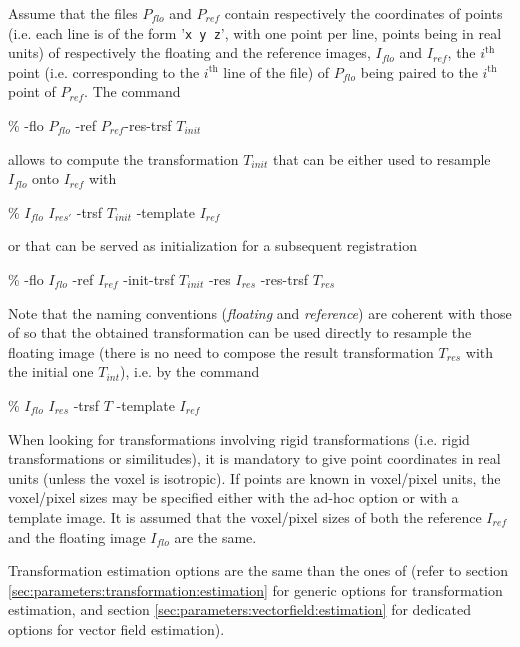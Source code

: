 Assume that the files $P_{flo}$ and  $P_{ref}$ contain respectively the coordinates of points (i.e. each line is of the form '\texttt{x y z}', with one point per line, points being in real units) of respectively the floating and the reference images, $I_{flo}$ and $I_{ref}$, the $i^{\mathrm{th}}$ point (i.e. corresponding to the $i^{\mathrm{th}}$ line of the file) of  $P_{flo}$ being paired to the  $i^{\mathrm{th}}$ point of  $P_{ref}$. The command
\begin{code}{0.8}
\% \pointmatching -flo $P_{flo}$ -ref $P_{ref}$-res-trsf $T_{init}$
\end{code}
allows to compute the transformation $T_{init}$ that can be 
either used to resample $I_{flo}$ onto $I_{ref}$ with
\begin{code}{0.8}
\% \applyTrsf $I_{flo}$ $I_{res'}$ -trsf $T_{init}$ -template $I_{ref}$ 
\end{code}
or that can be served as initialization for a subsequent registration
\begin{code}{0.8}
\% \blockmatching -flo $I_{flo}$ -ref $I_{ref}$ -init-trsf $T_{init}$ -res $I_{res}$ -res-trsf $T_{res}$ 
\end{code}

Note that the naming conventions (\textit{floating} and \textit{reference}) are coherent with those of \blockmatching so that the obtained transformation can be used directly to resample the floating image (there is no need to compose the result transformation $T_{res}$  with the initial one $T_{int}$), i.e. by the command
\begin{code}{0.8}
\% \applyTrsf $I_{flo}$ $I_{res}$ -trsf $T$ -template $I_{ref}$ 
\end{code}

\begin{attention} 
When looking for transformations involving rigid transformations (i.e. rigid transformations or similitudes), it is mandatory to give point coordinates in real units (unless the voxel is isotropic). If points are known in voxel/pixel units, the voxel/pixel sizes may be specified either with the ad-hoc option or with a template image. It is assumed that the voxel/pixel sizes of both the reference $I_{ref}$ and the floating image $I_{flo}$ are the same.
\end{attention}

Transformation estimation options are the same than the ones of {\blockmatching} (refer to section \ref{sec:parameters:transformation:estimation} for generic options for transformation estimation, and section \ref{sec:parameters:vectorfield:estimation} for dedicated options for vector field estimation).

